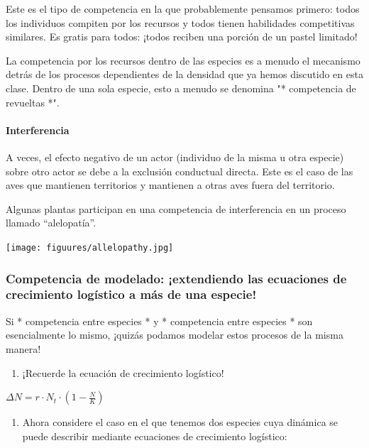 \documentclass[
]{article}
\providecommand{\tightlist}{%
  \setlength{\itemsep}{0pt}\setlength{\parskip}{0pt}}
\begin{document}
Este es el tipo de competencia en la que probablemente pensamos primero:
todos los individuos compiten por los recursos y todos tienen
habilidades competitivas similares. Es gratis para todos: ¡todos reciben
una porción de un pastel limitado!

La competencia por los recursos dentro de las especies es a menudo el
mecanismo detrás de los procesos dependientes de la densidad que ya
hemos discutido en esta clase. Dentro de una sola especie, esto a menudo
se denomina "* competencia de revueltas *".

\hypertarget{interferencia}{%
\paragraph{Interferencia}\label{interferencia}}

A veces, el efecto negativo de un actor (individuo de la misma u otra
especie) sobre otro actor se debe a la exclusión conductual directa.
Este es el caso de las aves que mantienen territorios y mantienen a
otras aves fuera del territorio.

Algunas plantas participan en una competencia de interferencia en un
proceso llamado ``alelopatía''.

\texttt{[image: figuures/allelopathy.jpg]}

\hypertarget{competencia-de-modelado-extendiendo-las-ecuaciones-de-crecimiento-loguxedstico-a-muxe1s-de-una-especie}{%
\subsubsection{Competencia de modelado: ¡extendiendo las ecuaciones de
crecimiento logístico a más de una
especie!}\label{competencia-de-modelado-extendiendo-las-ecuaciones-de-crecimiento-loguxedstico-a-muxe1s-de-una-especie}}

Si * competencia entre especies * y * competencia entre especies * son
esencialmente lo mismo, ¡quizás podamos modelar estos procesos de la
misma manera!

\begin{enumerate}
\def\labelenumi{\arabic{enumi}.}
\tightlist
\item
  ¡Recuerde la ecuación de crecimiento logístico!
\end{enumerate}

\(\Delta N = r\cdot N_t \cdot (1-\frac{N}{K})\)

\begin{enumerate}
\def\labelenumi{\arabic{enumi}.}
\setcounter{enumi}{1}
\tightlist
\item
  Ahora considere el caso en el que tenemos dos especies cuya dinámica
  se puede describir mediante ecuaciones de crecimiento logístico:
\end{enumerate}
\end{document}
